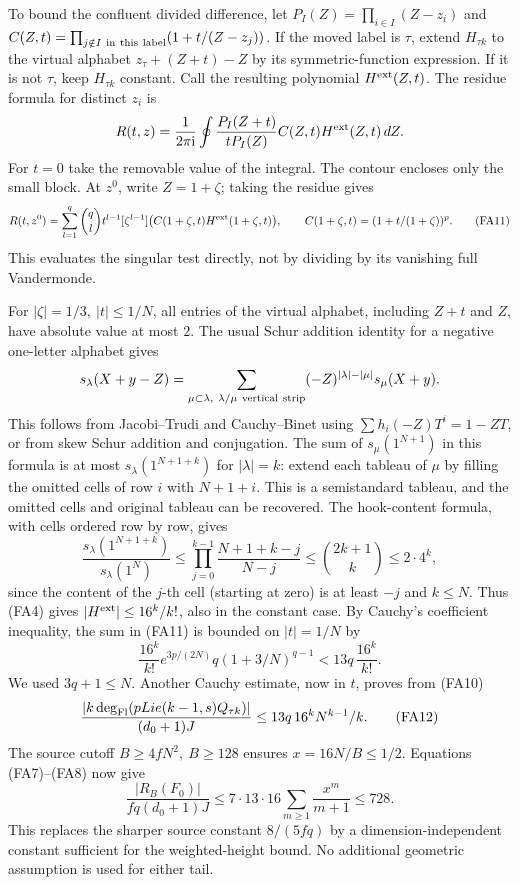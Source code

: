 To bound the confluent divided difference, let
\(P_I(Z)=\prod_{i\in I}(Z-z_i)\) and
\(C(Z,t)=\prod_{j\notin I\ {\rm in\ this\ label}}
(1+t/(Z-z_j))\). If the moved label is \(\tau\),
extend \(H_{\tau k}\) to the virtual alphabet
\(z_\tau+(Z+t)-Z\) by its symmetric-function expression.
If it is not \(\tau\), keep \(H_{\tau k}\) constant.
Call the resulting polynomial \(H^{\rm ext}(Z,t)\).
The residue formula for distinct \(z_i\) is
\[
 R(t,z)=\frac{1}{2\pi\mathrm{i}}\oint
 \frac{P_I(Z+t)}{tP_I(Z)} C(Z,t) H^{\rm ext}(Z,t)\,dZ .
\]
For \(t=0\) take the removable value of the integral.
The contour encloses only the small block. At \(z^0\), write
\(Z=1+\zeta\); taking the residue gives
\[
 R(t,z^0)=\sum_{l=1}^q\binom ql t^{l-1}
 [\zeta^{l-1}]\bigl(C(1+\zeta,t)H^{\rm ext}(1+\zeta,t)\bigr),
 \qquad C(1+\zeta,t)=(1+t/(1+\zeta))^p .
 \tag{FA11}
\]
This evaluates the singular test directly, not by dividing
by its vanishing full Vandermonde.

For \(|\zeta|=1/3,\ |t|\le1/N\), all entries of the virtual
alphabet, including \(Z+t\) and \(Z\), have absolute value at most
\(2\). The usual Schur addition identity for a negative one-letter
alphabet gives
\[
 s_\lambda(X+y-Z)=
 \sum_{\mu\subset\lambda,\ \lambda/\mu\ {\rm vertical\ strip}}
 (-Z)^{|\lambda|-|\mu|}s_\mu(X+y).
\]
This follows from Jacobi--Trudi and Cauchy--Binet using
\(\sum h_i(-Z)T^i=1-ZT\), or from skew Schur addition
and conjugation. The sum of \(s_\mu(1^{N+1})\) in this formula
is at most \(s_\lambda(1^{N+1+k})\) for \(|\lambda|=k\):
extend each tableau of \(\mu\) by filling the omitted cells
of row \(i\) with \(N+1+i\). This is a semistandard tableau,
and the omitted cells and original tableau can be recovered.
The hook-content formula, with cells ordered row by row,
gives
\[
 \frac{s_\lambda(1^{N+1+k})}{s_\lambda(1^N)}
 \le \prod_{j=0}^{k-1}\frac{N+1+k-j}{N-j}
 \le \binom{2k+1}{k}\le 2\cdot4^k ,
\]
since the content of the \(j\)-th cell (starting at zero)
is at least \(-j\) and \(k\le N\).
Thus (FA4) gives
\(|H^{\rm ext}|\le 16^k/k!\), also in the constant case.
By Cauchy's coefficient inequality, the sum in (FA11) is bounded
on \(|t|=1/N\) by
\[
 \frac{16^k}{k!}e^{3p/(2N)}
 q(1+3/N)^{q-1}<13q\,\frac{16^k}{k!}.
\]
We used \(3q+1\le N\).
Another Cauchy estimate, now in \(t\), proves from (FA10)
\[
 \frac{|k\deg_{\rm Fl}(pLie(k-1,s)Q_{\tau k})|}
 {(d_0+1)J}\le 13q\,16^k N^{k-1}/k .
 \tag{FA12}
\]
The source cutoff \(B\ge4fN^2,\ B\ge128\) ensures
\(x=16N/B\le1/2\). Equations (FA7)--(FA8) now give
\[
 \boxed{\quad
 \frac{|R_B(F_0)|}{fq(d_0+1)J}
 \le 7\cdot13\cdot16\sum_{m\ge1}\frac{x^m}{m+1}
 \le728 .\quad}
 \tag{FA13}
\]
This replaces the sharper source constant \(8/(5fq)\) by
a dimension-independent constant sufficient for the weighted-height
bound. No additional geometric assumption is used for either tail.

